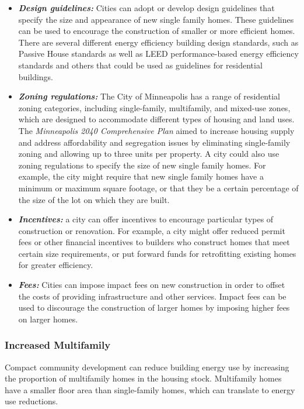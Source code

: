 \documentclass[
]{book}
\begin{document}
\begin{itemize}
\item
  \textbf{\emph{Design guidelines:}} Cities can adopt or develop design guidelines that specify the size and appearance of new single family homes. These guidelines can be used to encourage the construction of smaller or more efficient homes. There are several different energy efficiency building design standards, such as Passive House standards as well as LEED performance-based energy efficiency standards and others that could be used as guidelines for residential buildings.
\item
  \textbf{\emph{Zoning regulations:}} The City of Minneapolis has a range of residential zoning categories, including single-family, multifamily, and mixed-use zones, which are designed to accommodate different types of housing and land uses. The \emph{Minneapolis 2040 Comprehensive Plan} aimed to increase housing supply and address affordability and segregation issues by eliminating single-family zoning and allowing up to three units per property. A city could also use zoning regulations to specify the size of new single family homes. For example, the city might require that new single family homes have a minimum or maximum square footage, or that they be a certain percentage of the size of the lot on which they are built.
\item
  \textbf{\emph{Incentives:}} a city can offer incentives to encourage particular types of construction or renovation. For example, a city might offer reduced permit fees or other financial incentives to builders who construct homes that meet certain size requirements, or put forward funds for retrofitting existing homes for greater efficiency.
\item
  \textbf{\emph{Fees:}} Cities can impose impact fees on new construction in order to offset the costs of providing infrastructure and other services. Impact fees can be used to discourage the construction of larger homes by imposing higher fees on larger homes.
\end{itemize}

\hypertarget{increased-multifamily}{%
\subsubsection{Increased Multifamily}\label{increased-multifamily}}

Compact community development can reduce building energy use by increasing the proportion of multifamily homes in the housing stock. Multifamily homes have a smaller floor area than single-family homes, which can translate to energy use reductions.
\end{document}

